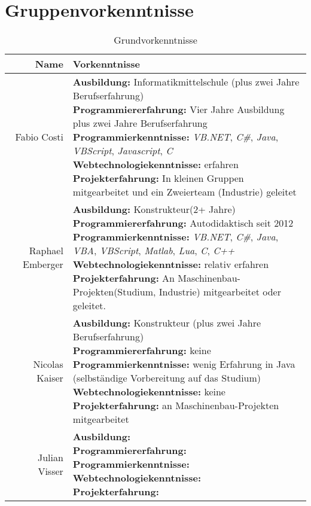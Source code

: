 \documentclass[10pt,a4paper,titlepage,twoside,german]{zhawreprt}
\begin{document}
\chapter{Gruppenvorkenntnisse}\label{chp:KnowHow}
\begin{table}[h!]
\begin{tabular}{|r|l|}
\hline
\textbf{Name} & \textbf{Vorkenntnisse}\\\hline\hline
Fabio Costi &
\parbox[t]{11cm}{\textbf{Ausbildung:} Informatikmittelschule (plus zwei Jahre Berufserfahrung)\\
\textbf{Programmiererfahrung:} Vier Jahre Ausbildung plus zwei Jahre Berufserfahrung\\
\textbf{Programmierkenntnisse:} \emph{VB.NET}, \emph{C\#}, \emph{Java}, \emph{VBScript}, \emph{Javascript}, \emph{C}\\
\textbf{Webtechnologiekenntnisse:} erfahren\\
\textbf{Projekterfahrung:} In kleinen Gruppen mitgearbeitet und ein Zweierteam (Industrie) geleitet
}\\\hline
Raphael Emberger &
\parbox[t]{11cm}{\textbf{Ausbildung:} Konstrukteur(2+ Jahre)\\
\textbf{Programmiererfahrung:} Autodidaktisch seit 2012\\
\textbf{Programmierkenntnisse:} \emph{VB.NET}, \emph{C\#}, \emph{Java}, \emph{VBA}, \emph{VBScript}, \emph{Matlab}, \emph{Lua}, \emph{C}, \emph{C++}\\
\textbf{Webtechnologiekenntnisse:} relativ erfahren\\
\textbf{Projekterfahrung:} An Maschinenbau-Projekten(Studium, Industrie) mitgearbeitet oder geleitet.
}\\\hline
Nicolas Kaiser &
\parbox[t]{11cm}{\textbf{Ausbildung:} Konstrukteur (plus zwei Jahre Berufserfahrung)\\
\textbf{Programmiererfahrung:} keine\\
\textbf{Programmierkenntnisse:} wenig Erfahrung in Java (selbständige Vorbereitung auf das Studium)\\
\textbf{Webtechnologiekenntnisse:} keine\\
\textbf{Projekterfahrung:} an Maschinenbau-Projekten mitgearbeitet
}\\\hline
Julian Visser &
\parbox[t]{11cm}{\textbf{Ausbildung:}\\
\textbf{Programmiererfahrung:}\\
\textbf{Programmierkenntnisse:}\\
\textbf{Webtechnologiekenntnisse:}\\
\textbf{Projekterfahrung:}
}\\\hline
\end{tabular}\caption{Grundvorkenntnisse}\label{tbl:KnowHow}
\end{table}
\end{document}
